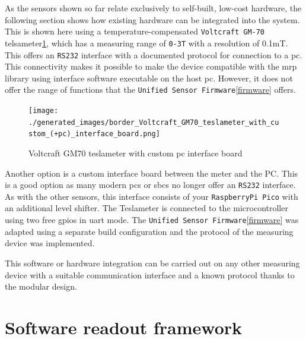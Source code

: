As the sensors shown so far relate exclusively to self-built, low-cost
hardware, the following section shows how existing hardware can be
integrated into the system. This is shown here using a
temperature-compensated \passthrough{\lstinline!Voltcraft GM-70!}
telsameter\ref{Voltcraft_GM70_teslameter_with_custom_(+pc)_interface_board.png},
which has a measuring range of \passthrough{\lstinline!0-3T!} with a
resolution of 0.1mT. This offers an \passthrough{\lstinline!RS232!}
interface with a documented protocol for connection to a \gls{pc}. This
connectivity makes it possible to make the device compatible with the
\gls{mrp} library using interface software \cite{VoltcraftGM70Rest}
executable on the host \gls{pc}. However, it does not offer the range of
functions that the
\passthrough{\lstinline!Unified Sensor Firmware!}\ref{firmware} offers.

\begin{figure}
\centering
\texttt{[image: ./generated\_images/border\_Voltcraft\_GM70\_teslameter\_with\_custom\_(+pc)\_interface\_board.png]}
\caption{Voltcraft GM70 teslameter with custom \gls{pc} interface board
\label{Voltcraft_GM70_teslameter_with_custom_(+pc)_interface_board.png}}
\end{figure}

Another option is a custom interface board between the meter and the PC.
This is a good option as many modern \gls{pc}s or \gls{sbc}s no longer
offer an \passthrough{\lstinline!RS232!} interface. As with the other
sensors, this interface consists of your
\passthrough{\lstinline!RaspberryPi Pico!} with an additional level
shifter. The Teslameter is connected to the microcontroller using two
free \gls{gpio}s in \gls{uart} mode. The
\passthrough{\lstinline!Unified Sensor Firmware!}\ref{firmware} was
adapted using a separate build configuration and the protocol of the
measuring device was implemented.

This software or hardware integration can be carried out on any other
measuring device with a suitable communication interface and a known
protocol thanks to the modular design.

\hypertarget{software-readout-framework}{%
\chapter{Software readout framework}\label{software-readout-framework}}

